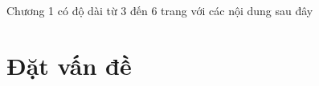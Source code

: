 \documentclass[../DoAn.tex]{subfiles}
\begin{document}




Chương 1 có độ dài từ 3 đến 6 trang với các nội dung sau đây

\section{Đặt vấn đề}
\label{section:1.1}

\end{document}
